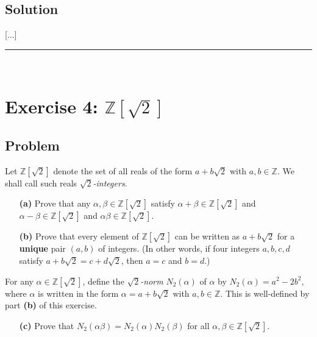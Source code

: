 \documentclass[paper=a4, fontsize=12pt]{scrartcl} %
\newcommand{\ZZ}{\mathbb{Z}} %
\newcommand{\tup}[1]{\left( #1 \right)}
\newcommand{\ive}[1]{\left[ #1 \right]}
\newcommand{\horrule}[1]{\rule{\linewidth}{#1}} %
\theoremstyle{plainsl}
\theoremstyle{definition}
\theoremstyle{remark}
\begin{document}
\subsection{Solution}

[...]

\horrule{0.3pt} \\[0.4cm]

\section{Exercise 4: $\ZZ\ive{\sqrt2}$}

\subsection{Problem}

Let $\ZZ\ive{\sqrt2}$ denote the set of all reals of the
form $a + b \sqrt2$ with $a, b \in \ZZ$.
We shall call such reals \textit{$\sqrt2$-integers}.

\begin{enumerate}

\item[\textbf{(a)}]
Prove that any $\alpha, \beta \in \ZZ\ive{\sqrt2}$ satisfy
$\alpha + \beta \in \ZZ\ive{\sqrt2}$ and
$\alpha - \beta \in \ZZ\ive{\sqrt2}$ and
$\alpha \beta \in \ZZ\ive{\sqrt2}$.

\item[\textbf{(b)}]
Prove that every element of $\ZZ\ive{\sqrt2}$ can be
written as $a + b \sqrt2$ for a \textbf{unique} pair
$\tup{a, b}$ of integers.
(In other words, if four integers $a, b, c, d$
satisfy $a + b \sqrt2 = c + d \sqrt2$, then $a = c$
and $b = d$.)

\end{enumerate}

For any $\alpha\in \ZZ\ive{\sqrt2}$, define the
\textit{$\sqrt2$-norm} $N_2\tup{\alpha}$ of $\alpha$ by
$N_2\tup{\alpha} = a^2 - 2b^2$,
where $\alpha$ is written in the form $\alpha = a + b \sqrt2$
with $a, b \in \ZZ$.
This is well-defined by part \textbf{(b)} of this
exercise.

\begin{enumerate}

\item[\textbf{(c)}]
Prove that
$N_2\tup{\alpha \beta} = N_2\tup{\alpha} N_2\tup{\beta}$
for all $\alpha, \beta \in \ZZ\ive{\sqrt2}$.

\end{enumerate}
\end{document}
